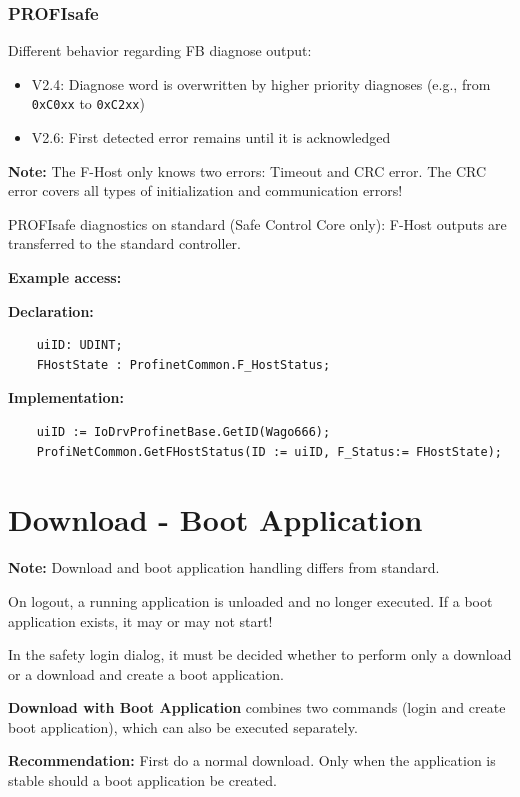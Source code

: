\documentclass[a4paper,12pt]{article}
\begin{document}
\subsubsection{PROFIsafe}

Different behavior regarding FB diagnose output:

\begin{itemize}
	\item V2.4: Diagnose word is overwritten by higher priority diagnoses (e.g., from \texttt{0xC0xx} to \texttt{0xC2xx})
	\item V2.6: First detected error remains until it is acknowledged
\end{itemize}

\textbf{Note:} The F-Host only knows two errors: Timeout and CRC error. The CRC error covers all types of initialization and communication errors!

PROFIsafe diagnostics on standard (Safe Control Core only): F-Host outputs are transferred to the standard controller.

\textbf{Example access:}

\textbf{Declaration:}
\begin{lstlisting}
	uiID: UDINT;
	FHostState : ProfinetCommon.F_HostStatus;
\end{lstlisting}

\textbf{Implementation:}
\begin{lstlisting}
	uiID := IoDrvProfinetBase.GetID(Wago666);
	ProfiNetCommon.GetFHostStatus(ID := uiID, F_Status:= FHostState);
\end{lstlisting}

\section*{Download - Boot Application}

\textbf{Note:} Download and boot application handling differs from standard.

On logout, a running application is unloaded and no longer executed. If a boot application exists, it may or may not start!

In the safety login dialog, it must be decided whether to perform only a download or a download and create a boot application.

\textbf{Download with Boot Application} combines two commands (login and create boot application), which can also be executed separately.

\textbf{Recommendation:} First do a normal download. Only when the application is stable should a boot application be created.
\end{document}
